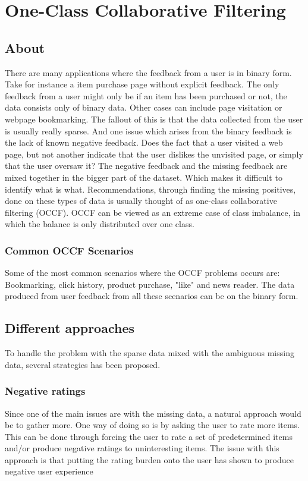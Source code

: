 \section{One-Class Collaborative Filtering}

\subsection{About}
    There are many applications where the feedback from a user is in binary form.
    Take for instance a item purchase page without explicit feedback.  The only
    feedback from a user might only be if an item has been purchased or not, the
    data consists only of binary data.  Other cases can include page visitation or
    webpage bookmarking.  The fallout of this is that the data collected from the
    user is usually really sparse.  And one issue which arises from the binary
    feedback is the lack of known negative feedback.  Does the fact that a user
    visited a web page, but not another indicate that the user dislikes the
    unvisited page, or simply that the user oversaw it?  The negative feedback and
    the missing feedback are mixed together in the bigger part of the dataset.
    Which makes it difficult to identify what is what.  Recommendations, through
    finding the missing positives, done on these types of data is usually thought
    of as one-class collaborative filtering (OCCF).  OCCF can be viewed as an
    extreme case of class imbalance, in which the balance is only distributed over
    one class. 

\subsubsection{Common OCCF Scenarios}
    Some of the most common scenarios where the OCCF problems occurs are:
    Bookmarking, click history, product purchase, "like" and news reader.  The data
    produced from user feedback from all these scenarios can be on the binary form.

\subsection{Different approaches}
    To handle the problem with the sparse data mixed with the ambiguous missing
    data, several strategies has been proposed.

\subsubsection{Negative ratings}
    Since one of the main issues are with the missing data, a natural approach
    would be to gather more.  One way of doing so is by asking the user to rate
    more items.  This can be done through forcing the user to rate a set of
    predetermined items and/or produce negative ratings to uninteresting items.
    The issue with this approach is that putting the rating burden onto the user
    has shown to produce negative user
    experience~\cite{Kelly:2003:IFI:959258.959260}

